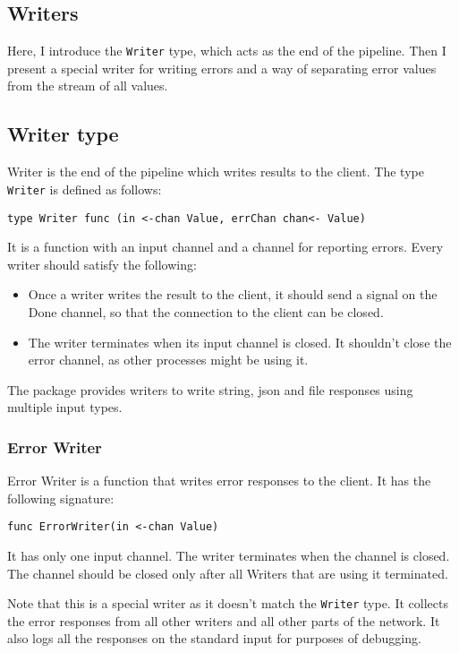\documentclass[12pt,a4paper]{article}
\begin{document}
\subsection{Writers}
Here, I introduce the \texttt{Writer} type, which acts as the end of the 
pipeline. Then I present a special writer for writing errors and a way
of separating error values from the stream of all values.
\subsection{Writer type}
Writer is the end of the pipeline which writes results to the client.
The type \texttt{Writer} is defined as follows:
\begin{lstlisting}
type Writer func (in <-chan Value, errChan chan<- Value)
\end{lstlisting}
It is a function with an input channel and a channel for reporting errors.
Every writer should satisfy the following:
\begin{itemize}
	\item Once a writer writes the result to the client, it should send a signal
		  on the Done channel, so that the connection to the client can be closed.
	\item The writer terminates when its input channel is closed. It shouldn't
		  close the error channel, as other processes might be using it.
\end{itemize}
The package provides writers to write string, json and file responses
using multiple input types.

\subsubsection{Error Writer}
Error Writer is a function that writes error responses to the client.
It has the following signature:
\begin{lstlisting}
func ErrorWriter(in <-chan Value)
\end{lstlisting}
It has only one input channel. The writer terminates when the channel
is closed. The channel should be closed only after all Writers that 
are using it terminated.

Note that this is a special writer as it doesn't match the \texttt{Writer} type. 
It collects the error responses from all other writers and all other parts
of the network. It also logs all the responses on the standard input for
purposes of debugging.
\end{document}
